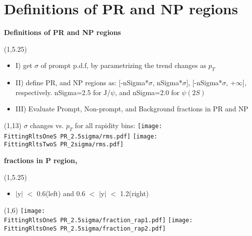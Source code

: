 \documentclass[11pt,slidescentered,red,compress,handout,hyperref={bookmarks=true},mathseriftable]{beamer}
\newcommand{\Jpsi}{\mathrm{J}/\psi}
\newcommand{\FittingRltsOneS}{../Psi1S/Fit/parameter/evaluateCtau/}
\newcommand{\FittingRltsTwoS}{../Psi2S/Fit/parameter/evaluateCtau/}
\begin{document}
%

\section{Definitions of PR and NP regions } 
\begin{frame}[t]{\small \bf Definitions of PR and NP regions }{}
\begin{textblock}{48}(1,5.25)
\begin{itemize}
\scriptsize \item I) get $\sigma$ of prompt p.d.f, by parametrizing the trend changes as $p_{T}$
\scriptsize \item II) define PR, and NP regions as: [-nSigma*$\sigma$, nSigma*$\sigma$], [-nSigma*$\sigma$, +$\infty$], respectively.
nSigma=2.5 for $\Jpsi$, and nSigma=2.0 for $\psi(2S)$
\scriptsize \item III) Evaluate Prompt, Non-prompt, and Background fractions in PR and NP
\end{itemize}
\end{textblock}
\begin{textblock}{48}(1,13)
\scriptsize $\sigma$ changes vs. $p_{T}$ for all rapidity bins: 
\hspace*{10pt} \texttt{[image: \\FittingRltsOneS PR\_2.5sigma/rms.pdf]}
\hspace*{10pt} \texttt{[image: \\FittingRltsTwoS PR\_2sigma/rms.pdf]}
\end{textblock}
\end{frame}

\begin{frame}[t]{\small \bf fractions in P region,  }{}
\begin{textblock}{48}(1,5.25)
\begin{itemize}
\scriptsize \item  $|$y$|$ $<$ 0.6(left) and 0.6 $<$ $|$y$|$ $<$ 1.2(right)
\end{itemize}
\end{textblock}
\begin{textblock}{48}(1,6)
\hspace*{10pt} \texttt{[image: \\FittingRltsOneS PR\_2.5sigma/fraction\_rap1.pdf]}
\hspace*{10pt} \texttt{[image: \\FittingRltsOneS PR\_2.5sigma/fraction\_rap2.pdf]}
\end{textblock}
\end{frame}
\end{document}
